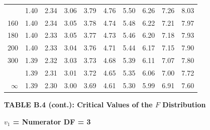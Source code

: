 \documentclass[10pt]{article}
\begin{document}
\begin{longtable}{@{}r!{\vrule width 0.8pt\hspace{0.55em}}rrrrrrrrr@{}}
 & 1.40 & 2.34 & 3.06 & 3.79 & 4.76 & 5.50 & 6.26 & 7.26 & 8.03 \\
160 & 1.40 & 2.34 & 3.05 & 3.78 & 4.74 & 5.48 & 6.22 & 7.21 & 7.97 \\
180 & 1.40 & 2.33 & 3.05 & 3.77 & 4.73 & 5.46 & 6.20 & 7.18 & 7.93 \\
200 & 1.40 & 2.33 & 3.04 & 3.76 & 4.71 & 5.44 & 6.17 & 7.15 & 7.90 \\
300 & 1.39 & 2.32 & 3.03 & 3.73 & 4.68 & 5.39 & 6.11 & 7.07 & 7.80 \\
 & 1.39 & 2.31 & 3.01 & 3.72 & 4.65 & 5.35 & 6.06 & 7.00 & 7.72 \\
$\infty$ & 1.39 & 2.30 & 3.00 & 3.69 & 4.61 & 5.30 & 5.99 & 6.91 & 7.60 \\
\end{longtable}
\newpage
\thispagestyle{empty}
\begin{center}
{\large\bfseries TABLE B.4 (cont.): Critical Values of the $F$ Distribution\par}
\end{center}
{\large\bfseries $v_1$ = Numerator DF = 3\par}
\vspace{0.5em}
\small
\end{document}
